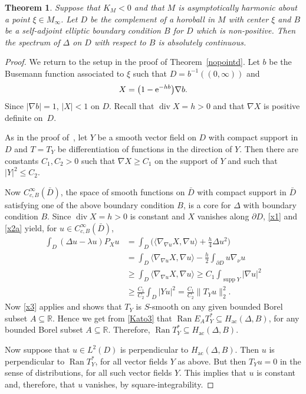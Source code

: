 \documentclass[10pt,a4paper]{amsart}
\numberwithin{equation}{section}
\newtheorem{Theorem}{Theorem}[section]
\DeclareMathOperator{\diver}{div}
\DeclareMathOperator{\ran}{Ran}
\DeclareMathOperator{\supp}{supp}
\def\ac{\mathrm{ac}}
\def\R{\mathbb R}
\begin{document}
\begin{Theorem}%
Suppose that $K_M<0$ and that $M$ is asymptotically harmonic about a point $\xi\in M_\infty$.
Let $D$ be the complement of a horoball in $M$ with center $\xi$
and $B$ be a self-adjoint elliptic boundary condition $B$ for $D$ which is non-positive.
Then the spectrum of $\Delta$ on $D$ with respect to $B$ is absolutely continuous.
\end{Theorem}

\begin{proof}
We return to the setup in the proof of Theorem~\ref{nopointd}.
Let $b$ be the Busemann function associated to $\xi$ such that $D=b^{-1}((0,\infty))$
and
\begin{align*}
 X = \bigl(1 - {\rm e}^{-hb}\bigr)\nabla b.
\end{align*}
Since $|\nabla b|=1$, $|X|<1$ on $D$.
Recall that $\diver X=h>0$ and that $\nabla X$ is positive definite on~$D$.

As in the proof of~\cite[Theorem~2]{Xavier1988}, let $Y$ be a smooth vector field on $D$ with compact support
in $D$ and $T=T_Y$ be differentiation of functions in the direction of $Y$.
Then there are constants $C_1,C_2>0$ such that $\nabla X\ge C_1$ on the support of $Y$
and such that $|Y|^2\le C_2$.

Now $C^\infty_{c,B}(\bar D)$, the space of smooth functions on $\bar D$ with compact support in $\bar D$
satisfying one of the above boundary condition $B$, is a core for $\Delta$ with boundary condition $B$.
Since $\diver X=h>0$ is constant and $X$ vanishes along $\partial D$, \eqref{x1} and \eqref{x2a} yield,
for $u\in C^\infty_{c,B}(\bar D)$,
\begin{align*}
 \int_D (\Delta u-\lambda u) P_Xu
 &= \int_D \biggl(\langle\nabla_{\nabla u}X,\nabla u\rangle + \frac{h}4\Delta u^2\biggr) \\
 &= \int_D \langle\nabla_{\nabla u}X,\nabla u\rangle - \frac{h}2\int_{\partial D}u\nabla_\nu u \\
 &\ge \int_D \langle\nabla_{\nabla u}X,\nabla u\rangle \ge C_1 \int_{\supp Y}|\nabla u|^2 \\
 &\ge \frac{C_1}{C_2}\int_D|Yu|^2 = \frac{C_1}{C_2}\|T_Yu\|_2^2.
\end{align*}
Now \eqref{x3} applies and shows that $T_Y$ is $S$-smooth on any given bounded Borel subset $A\subseteq\R$.
Hence we get from \eqref{Kato3} that $\ran E_AT_Y^*\subseteq H_{\ac}(\Delta,B)$, for any bounded Borel subset $A\subseteq\R$.
Therefore, $\ran T_Y^*\subseteq H_{\ac}(\Delta,B)$.

Now suppose that $u\in L^2(D )$ is perpendicular to $H_{\ac}(\Delta,B)$.
Then $u$ is perpendicular to $\ran T_Y^*$, for all vector fields $Y$ as above.
But then $T_Yu=0$ in the sense of distributions, for all such vector fields $Y$.
This implies that $u$ is constant and, therefore, that $u$ vanishes, by square-integrability.
\end{proof}
\end{document}
